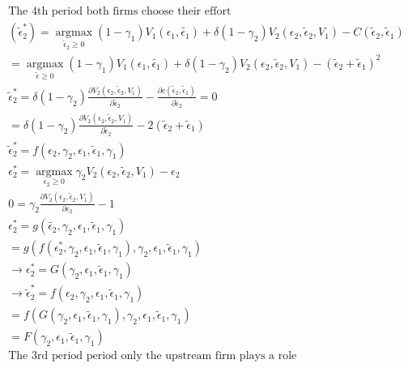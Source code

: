 \documentclass{article}
\begin{document}
\begin{align*}
\text{The 4th period both firms choose their effort} \\
(\tilde{\epsilon}_2^*)= \operatorname*{argmax}_{ \tilde{\epsilon}_2 \geq 0 } 
(1-\gamma_1)V_1(\epsilon_1,\tilde{\epsilon_1} )
+\delta (1-\gamma_2)V_2(\epsilon_2,\tilde{\epsilon}_2,V_1)
-C(\tilde{\epsilon}_2,\tilde{\epsilon}_1) \\
= \operatorname*{argmax}_{ \tilde{\epsilon} \geq 0 } 
(1-\gamma_1)V_1(\epsilon_1,\tilde{\epsilon_1})+
\delta (1-\gamma_2)V_2(\epsilon_2,\tilde{\epsilon}_2,V_1)
-(\tilde{\epsilon}_2+\tilde{\epsilon}_1)^2 \\
\tilde{\epsilon}_2^*=
\delta (1-\gamma_2) \frac{ \partial V_2(\epsilon_2,\tilde{\epsilon}_2,V_1)}{\partial \tilde{\epsilon}_2}
-\frac{\partial c(\tilde{\epsilon}_2,\tilde{\epsilon}_1)}{\partial \tilde{\epsilon}_2 }=0 \\
=\delta (1-\gamma_2) \frac{ \partial V_2(\epsilon_2,\tilde{\epsilon}_2,V_1)}{\partial \tilde{\epsilon}_2}
-2(\tilde{\epsilon}_2+\tilde{\epsilon}_1) \\
\tilde{\epsilon}_2^* = f(\epsilon_2,\gamma_2,\epsilon_1,\tilde{\epsilon}_1,\gamma_1) \\
\epsilon_2^*=
\operatorname*{argmax}_{ \epsilon_2 \geq 0 } \gamma_2 V_2(\epsilon_2,\tilde{\epsilon}_2,V_1) - \epsilon_2   \\
0= \gamma_2 \frac{\partial V_2(\epsilon_2,\tilde{\epsilon}_2,V_1)}{\partial \epsilon_2}-1 \\
\epsilon_2^* = g(\tilde{\epsilon_2},\gamma_2,\epsilon_1,\tilde{\epsilon}_1,\gamma_1) \\
= g(f(\epsilon_2^*,\gamma_2,\epsilon_1,\tilde{\epsilon}_1,\gamma_1),\gamma_2,\epsilon_1,\tilde{\epsilon}_1,\gamma_1) \\
\rightarrow \epsilon_2^* = G(\gamma_2,\epsilon_1,\tilde{\epsilon}_1,\gamma_1) \\
\rightarrow \tilde{\epsilon}_2^* = f(\epsilon_2,\gamma_2,\epsilon_1,\tilde{\epsilon}_1,\gamma_1) \\
= f(G(\gamma_2,\epsilon_1,\tilde{\epsilon}_1,\gamma_1),\gamma_2,\epsilon_1,\tilde{\epsilon}_1,\gamma_1) \\
= F(\gamma_2,\epsilon_1,\tilde{\epsilon}_1,\gamma_1) \\
\text{The 3rd period period only the upstream firm plays a role} \\

\end{align*}
\end{document}
